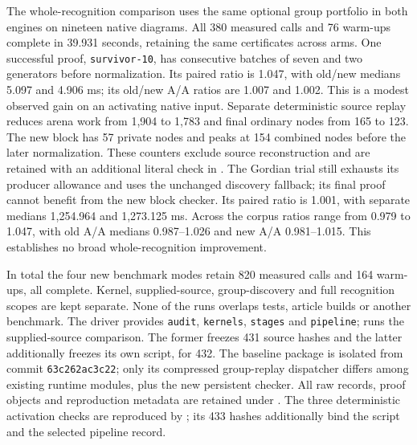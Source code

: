 The whole-recognition comparison uses the same optional group portfolio in
both engines on nineteen native diagrams. All 380 measured calls and 76
warm-ups complete in 39.931 seconds, retaining the same certificates across
arms. One successful proof, \texttt{survivor-10}, has consecutive batches of
seven and two generators before normalization. Its paired ratio is 1.047,
with old/new medians 5.097 and 4.906 ms; its old/new A/A ratios are 1.007
and 1.002. This is a modest observed gain on an activating native input.
Separate deterministic source replay reduces arena work from 1,904 to 1,783
and final ordinary nodes from 165 to 123. The new block has 57 private nodes
and peaks at 154 combined nodes before the later normalization. These counters
exclude source reconstruction and are retained with an additional literal
check in .
The Gordian trial still exhausts its producer allowance and
uses the unchanged discovery fallback; its final proof cannot benefit from
the new block checker. Its paired ratio is 1.001, with separate medians
1,254.964 and 1,273.125 ms. Across the corpus ratios range from 0.979 to
1.047, with old A/A medians 0.987--1.026 and new A/A 0.981--1.015. This
establishes no broad whole-recognition improvement.



In total the four new benchmark modes retain 820 measured calls and 164
warm-ups, all complete. Kernel, supplied-source, group-discovery and full
recognition scopes are kept separate. None of the runs overlaps tests,
article builds or another benchmark. The driver
 provides
\texttt{audit}, \texttt{kernels}, \texttt{stages} and \texttt{pipeline};
 runs the supplied-source comparison.
The former freezes 431 source hashes and the latter additionally freezes
its own script, for 432. The baseline package is isolated from commit
\texttt{63c262ac3c22}; only its compressed group-replay dispatcher differs
among existing runtime modules, plus the new persistent checker. All raw
records, proof objects and reproduction metadata are retained under
.
The three deterministic activation checks are reproduced by
; its 433 hashes additionally bind
the script and the selected pipeline record.
